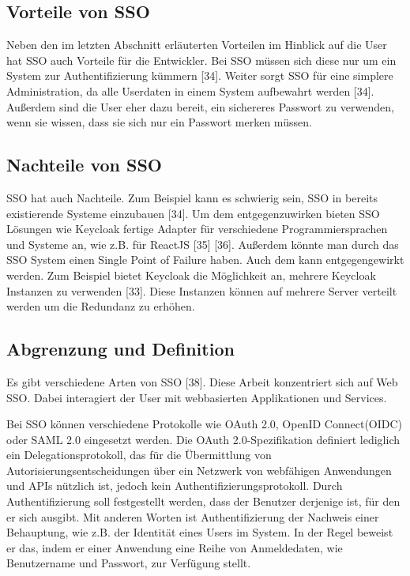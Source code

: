 \subsection{Vorteile von SSO}

Neben den im letzten Abschnitt erläuterten Vorteilen im Hinblick auf die User hat SSO auch Vorteile für die Entwickler. Bei SSO müssen sich diese nur um ein System zur Authentifizierung kümmern [34]. Weiter sorgt SSO für eine simplere Administration, da alle Userdaten in einem System aufbewahrt werden [34]. Außerdem sind die User eher dazu bereit, ein sichereres Passwort zu verwenden, wenn sie wissen, dass sie sich nur ein Passwort merken müssen.

\subsection{Nachteile von SSO}

SSO hat auch Nachteile. Zum Beispiel kann es schwierig sein, SSO in bereits existierende Systeme einzubauen [34]. Um dem entgegenzuwirken bieten SSO Lösungen wie Keycloak fertige Adapter für verschiedene Programmiersprachen und Systeme an, wie z.B. für ReactJS [35] [36]. Außerdem könnte man durch das SSO System einen Single Point of Failure haben. Auch dem kann entgegengewirkt werden. Zum Beispiel bietet Keycloak die Möglichkeit an, mehrere Keycloak Instanzen zu verwenden [33]. Diese Instanzen können auf mehrere Server verteilt werden um die Redundanz zu erhöhen. %

\subsection{Abgrenzung und Definition}

Es gibt verschiedene Arten von SSO [38]. Diese Arbeit konzentriert sich auf Web SSO. Dabei interagiert der User mit webbasierten Applikationen und Services.

Bei SSO können verschiedene Protokolle wie OAuth 2.0, OpenID Connect(OIDC) oder SAML 2.0 eingesetzt werden. Die OAuth 2.0-Spezifikation definiert lediglich ein Delegationsprotokoll, das für die Übermittlung von Autorisierungsentscheidungen über ein Netzwerk von webfähigen Anwendungen und APIs nützlich ist, jedoch kein Authentifizierungsprotokoll. Durch Authentifizierung soll festgestellt werden, dass der Benutzer derjenige ist, für den er sich ausgibt. Mit anderen Worten ist Authentifizierung der Nachweis einer Behauptung, wie z.B. der Identität eines Users im System. In der Regel beweist er das, indem er einer Anwendung eine Reihe von Anmeldedaten, wie Benutzername und Passwort, zur Verfügung stellt. \cite{OAuth2inAction}

